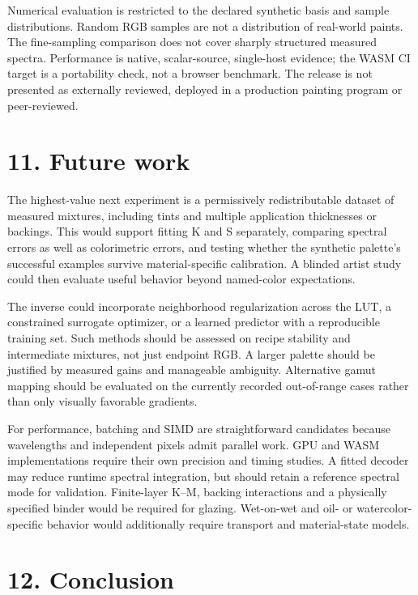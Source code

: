 \documentclass[
  10pt,
  twocolumn]{article}
\begin{document}
Numerical evaluation is restricted to the declared synthetic basis and
sample distributions. Random RGB samples are not a distribution of
real-world paints. The fine-sampling comparison does not cover sharply
structured measured spectra. Performance is native, scalar-source,
single-host evidence; the WASM CI target is a portability check, not a
browser benchmark. The release is not presented as externally reviewed,
deployed in a production painting program or peer-reviewed.

\hypertarget{future-work}{%
\section{11. Future work}\label{future-work}}

The highest-value next experiment is a permissively redistributable
dataset of measured mixtures, including tints and multiple application
thicknesses or backings. This would support fitting K and S separately,
comparing spectral errors as well as colorimetric errors, and testing
whether the synthetic palette's successful examples survive
material-specific calibration. A blinded artist study could then
evaluate useful behavior beyond named-color expectations.

The inverse could incorporate neighborhood regularization across the
LUT, a constrained surrogate optimizer, or a learned predictor with a
reproducible training set. Such methods should be assessed on recipe
stability and intermediate mixtures, not just endpoint RGB. A larger
palette should be justified by measured gains and manageable ambiguity.
Alternative gamut mapping should be evaluated on the currently recorded
out-of-range cases rather than only visually favorable gradients.

For performance, batching and SIMD are straightforward candidates
because wavelengths and independent pixels admit parallel work. GPU and
WASM implementations require their own precision and timing studies. A
fitted decoder may reduce runtime spectral integration, but should
retain a reference spectral mode for validation. Finite-layer K--M,
backing interactions and a physically specified binder would be required
for glazing. Wet-on-wet and oil- or watercolor-specific behavior would
additionally require transport and material-state models.

\hypertarget{conclusion}{%
\section{12. Conclusion}\label{conclusion}}
\end{document}
